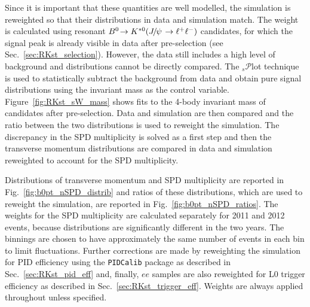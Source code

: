 Since it is important that these quantities are well modelled, the simulation is
reweighted so that their distributions in data and simulation match.
The weight is calculated using resonant $\decay{\Bz}{\Kstarz(\jpsi\to\ll)}$ candidates, for which the signal peak
is already visible in data after pre-selection (see Sec.~\ref{sec:RKst_selection}). However, the data still includes
a high level of background and distributions cannot be directly compared.
The $_s\mathcal{P}$lot technique~\cite{sPlot} is used to statistically subtract the background from
data and obtain pure signal distributions using the invariant mass as the control variable.
Figure~\ref{fig:RKst_sW_mass} shows fits to the 4-body invariant mass of candidates after pre-selection.
Data and simulation are then compared and the ratio between the two distributions is used to reweight
the simulation. The discrepancy in the SPD multiplicity is solved as a first step and then the \Bz transverse momentum 
distributions are compared in data and simulation reweighted to account for the SPD multiplicity.

Distributions of \Bz transverse momentum and SPD multiplicity are reported in Fig.~\ref{fig:b0pt_nSPD_distrib}
and ratios of these distributions, which are used to reweight the simulation, are reported in 
Fig.~\ref{fig:b0pt_nSPD_ratios}. The weights for the SPD multiplicity are calculated
separately for 2011 and 2012 events, because distributions are significantly different
in the two years. The binnings are chosen to have approximately 
the same number of events in each bin to limit fluctuations.
Further corrections are made by reweighting the simulation for PID efficiency using the
\verb!PIDCalib! package as described in Sec.~\ref{sec:RKst_pid_eff} and, finally, 
$ee$ samples are also reweighted for L0 trigger efficiency as described in Sec.~\ref{sec:RKst_trigger_eff}.
Weights are always applied throughout unless specified.

